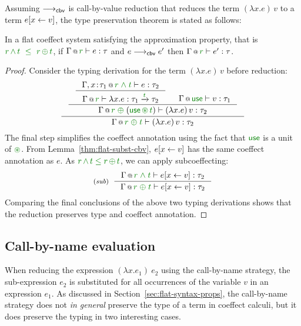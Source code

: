 Assuming $\longrightarrow_{\textnormal{\sffamily cbv}}$ is call-by-value reduction that reduces the term
$(\lambda x.e)\,v$ to a term $e[x \leftarrow v]$, the type preservation theorem is
stated as follows:

\begin{theorem}
\label{thm:cbv-reduction}
In a flat coeffect system satisfying the approximation property, that is
$\cclrd{r}\,\czip\,\cclrd{t}~\;\cleq~\;\cclrd{r}\,\cpar\,\cclrd{t}$,
if $\coctx{\Gamma}{\cclrd{r}} \vdash e : \tau$
and $e \longrightarrow_{\textnormal{\sffamily cbv}} e'$ then $\coctx{\Gamma}{\cclrd{r}} \vdash e' : \tau$.
\end{theorem}
\begin{proof}
Consider the typing derivation for the term $(\lambda x.e)\,v$ before reduction:
\begin{equation*}
\inference
  { \inference
  { \inference
      {\coctx{\Gamma, x\!:\!\tau_1}{\cclrd{r}\;\czip\;\cclrd{t}} \vdash e : \tau_2}
      {\coctx{\Gamma}{\cclrd{r}} \vdash \lambda x.e : \tau_1 \xrightarrow{\cclrd{t}} \tau_2 } &
   \coctx{\Gamma}{\cunit} \vdash v : \tau_1 }
  {\coctx{\Gamma}{\cclrd{r} \;\cpar\; (\cunit \,\cseq\, \cclrd{t})} \vdash (\lambda x.e)\,v : \tau_2} }
  {\coctx{\Gamma}{\cclrd{r} \;\cpar\; \cclrd{t}} \vdash (\lambda x.e)\,v : \tau_2}
\end{equation*}
The final step simplifies the coeffect annotation using the fact that $\cunit$ is a unit of $\cseq$.
From Lemma~\ref{thm:flat-subst-cbv}, $e[x \leftarrow v]$ has the same coeffect annotation as $e$.
As $\cclrd{r}\,\czip\,\cclrd{t}\;\cleq\;\cclrd{r}\,\cpar\,\cclrd{t}$, we can apply subcoeffecting:
%
\begin{equation*}
\tyrule{sub}
 { \coctx{\Gamma}{\cclrd{r}\;\czip\;\cclrd{t}} \vdash \subst{e}{x}{v} : \tau_2 }
 { \coctx{\Gamma}{\cclrd{r}\;\cpar\;\cclrd{t}} \vdash \subst{e}{x}{v} : \tau_2 }
\end{equation*}
%
Comparing the final conclusions of the above two typing derivations shows that
the reduction preserves type and coeffect annotation.
\end{proof}


\subsection{Call-by-name evaluation}
\label{sec:flat-syntax-cbn}

When reducing the expression $(\lambda x.e_1)~e_2$ using the call-by-name strategy, the
sub-expression $e_2$ is substituted for all occurrences of the variable $v$ in an expression $e_1$.
As discussed in Section~\ref{sec:flat-syntax-props}, the call-by-name strategy does not \emph{in
general} preserve the type of a term in coeffect calculi, but it does preserve the typing in two
interesting cases.

